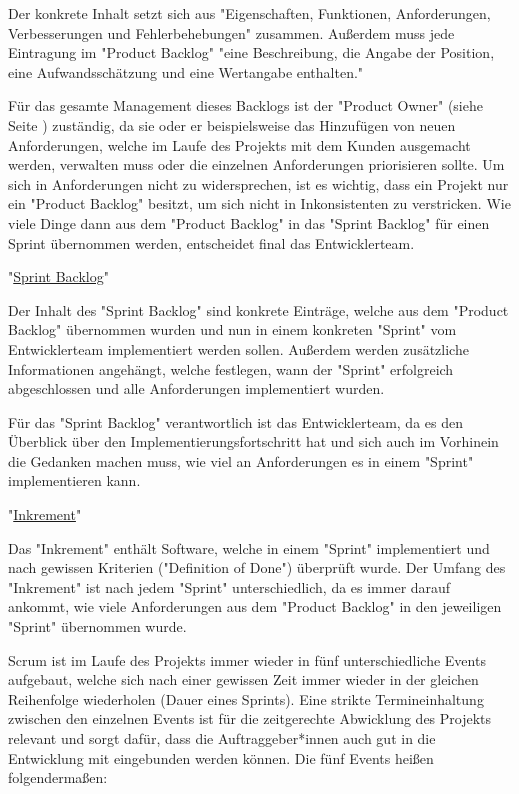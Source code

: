 Der konkrete Inhalt setzt sich aus "Eigenschaften, Funktionen, Anforderungen, Verbesserungen und Fehlerbehebungen" \cite{ProductBacklog} zusammen.  Außerdem muss jede Eintragung im "Product Backlog" "eine Beschreibung, die Angabe der Position, eine Aufwandsschätzung und eine Wertangabe enthalten." \cite{ProductBacklog}

Für das gesamte Management dieses Backlogs ist der "Product Owner" (siehe Seite \pageref{sec:productowner}) zuständig, da sie oder er beispielsweise das Hinzufügen von neuen Anforderungen, welche im Laufe des Projekts mit dem Kunden ausgemacht werden, verwalten muss oder die einzelnen Anforderungen priorisieren sollte. Um sich in Anforderungen nicht zu widersprechen, ist es wichtig, dass ein Projekt nur ein "Product Backlog" besitzt, um sich nicht in Inkonsistenten zu verstricken. Wie viele Dinge dann aus dem "Product Backlog" in das "Sprint Backlog" für einen Sprint übernommen werden, entscheidet final das Entwicklerteam. \cite{ProductBacklog}

"\underline{Sprint Backlog}"

Der Inhalt des "Sprint Backlog" sind konkrete Einträge, welche aus dem "Product Backlog" übernommen wurden und nun in einem konkreten "Sprint" vom Entwicklerteam implementiert werden sollen. Außerdem werden zusätzliche Informationen angehängt, welche festlegen, wann der "Sprint" erfolgreich abgeschlossen und alle Anforderungen implementiert wurden. \cite{SprintBacklog}

Für das "Sprint Backlog" verantwortlich ist das Entwicklerteam, da es den Überblick über den Implementierungsfortschritt hat und sich auch im Vorhinein die Gedanken machen muss, wie viel an Anforderungen es in einem "Sprint" implementieren kann. \cite{SprintBacklog}

"\underline{Inkrement}"

Das "Inkrement" enthält Software, welche in einem "Sprint" implementiert und nach gewissen Kriterien ("Definition of Done") überprüft wurde. Der Umfang des "Inkrement" ist nach jedem "Sprint" unterschiedlich, da es immer darauf ankommt, wie viele Anforderungen aus dem "Product Backlog" in den jeweiligen "Sprint" übernommen wurde. \cite{Inkrement}


Scrum ist im Laufe des Projekts immer wieder in fünf unterschiedliche Events aufgebaut, welche sich nach einer gewissen Zeit immer wieder in der gleichen Reihenfolge wiederholen (Dauer eines Sprints). Eine strikte Termineinhaltung zwischen den einzelnen Events ist für die zeitgerechte Abwicklung des Projekts relevant und sorgt dafür, dass die Auftraggeber*innen auch gut in die Entwicklung mit eingebunden werden können. Die fünf Events heißen folgendermaßen:

